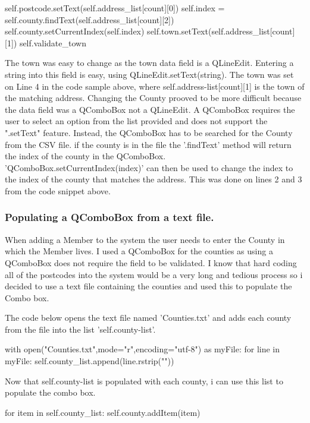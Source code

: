 \begin{python}
\begin{python}
self.postcode.setText(self.address_list[count][0])
self.index = self.county.findText(self.address_list[count][2])
self.county.setCurrentIndex(self.index)
self.town.setText(self.address_list[count][1])
self.validate_town
\end{python}

The town was easy to change as the town data field is a QLineEdit. Entering a string into this field is easy, using QLineEdit.setText(string). The town was set on Line 4 in the code sample above, where self.address-list[count][1] is the town of the matching address. Changing the County prooved to be more difficult because the data field was a QComboBox not a QLineEdit. A QComboBox requires the user to select an option from the list provided and does not support the ".setText" feature. Instead, the QComboBox has to be searched for the County from the CSV file. if the county is in the file the '.findText' method will return the index of the county in the QComboBox. 'QComboBox.setCurrentIndex(index)' can then be used to change the index to the index of the county that matches the address. This was done on lines 2 and 3 from the code snippet above.

\subsubsection{Populating a QComboBox from a text file.}

When adding a Member to the system the user needs to enter the County in which the Member lives. I used a QComboBox for the counties as using a QComboBox does not require the field to be validated. I know that hard coding all of the postcodes into the system would be a very long and tedious process so i decided to use a text file containing the counties and used this to populate the Combo box.

The code below opens the text file named 'Counties.txt' and adds each county from the file into the list 'self.county-list'.

\begin{python}
with open("Counties.txt",mode="r",encoding="utf-8") as myFile:
                    for line in myFile:
                        self.county_list.append(line.rstrip("\n"))
\end{python}

Now that self.county-list is populated with each county, i can use this list to populate the combo box.

\begin{python}
for item in self.county_list:
                        self.county.addItem(item)
\end{python}


\end{python}

